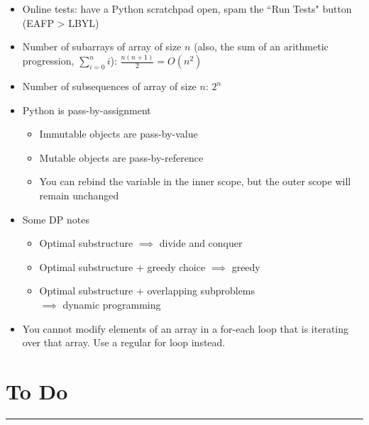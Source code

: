 \documentclass[12pt, titlepage]{article}
\begin{document}
\begin{itemize}
  \item Online tests: have a Python scratchpad open, spam the ``Run Tests" button (EAFP > LBYL)
  \item Number of subarrays of array of size $n$ (also, the sum of an arithmetic progression, $\sum_{i=0}^{n}i$): $\frac{n(n+1)}{2} = O(n^2)$
  \item Number of subsequences of array of size $n$: $2^n$
  \item Python is pass-by-assignment
  \begin{itemize}
    \item Immutable objects are pass-by-value
    \item Mutable objects are pass-by-reference
    \item You can rebind the variable in the inner scope, but the outer scope will remain unchanged
  \end{itemize}
  \item Some DP notes
  \begin{itemize}
    \item Optimal substructure $\implies$ divide and conquer
    \item Optimal substructure + greedy choice $\implies$ greedy
    \item Optimal substructure + overlapping subproblems \\
          \-\hspace{1em}$\implies$ dynamic programming
  \end{itemize}
  \item You cannot modify elements of an array in a for-each loop that is iterating over that array. Use a regular for loop instead.
\end{itemize}

\section{To Do}
\hrule\vspace{5ex}
\end{document}
